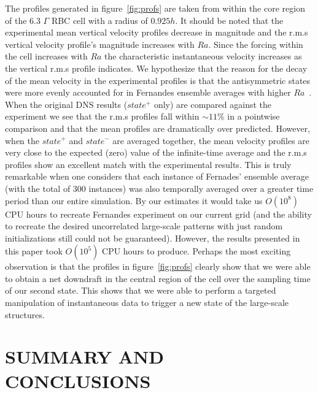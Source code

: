 \documentclass[twocolumn,10pt]{tsfp}
\begin{document}
The profiles generated in figure~\ref{fig:profs} are taken from within the core region of the 6.3 $\Gamma$ RBC cell with a radius of $0.925h$. It should be noted that the experimental mean vertical velocity profiles decrease in magnitude and the r.m.s vertical velocity profile's magnitude increases with $Ra$.  Since the forcing within the cell increases with $Ra$ the characteristic instantaneous velocity increases as the vertical r.m.s profile indicates. We hypothesize that the reason for the decay of the mean velocity in the experimental profiles is that the antisymmetric states were more evenly accounted for in Fernandes ensemble averages with higher $Ra$~\citep{fernandes2001spatial}. When the original DNS results ($state^+$ only) are compared against the experiment we see that the r.m.s profiles fall within $\sim11$\% in a pointwise comparison and that the mean profiles are dramatically over predicted.  However, when the $state^+$ and $state^-$ are averaged together, the mean velocity profiles are very close to the expected (zero) value of the infinite-time average and the r.m.s profiles show an excellent match with the experimental results. This is truly remarkable when one considers that each instance of Fernades' ensemble average (with the  total of 300 instances) was also temporally averaged over a greater time period than our entire simulation. By our estimates it would take us $O(10^8)$ CPU hours to recreate Fernandes experiment on our current grid (and the ability to recreate the desired uncorrelated large-scale patterns with just random initializations still could not be guaranteed). However, the results presented in this paper took $O(10^5)$ CPU hours to produce.  Perhaps the most exciting observation is that the profiles in figure~\ref{fig:profs} clearly show that we were able to obtain a net downdraft in the central region of the cell over the sampling time of our second state.   This shows that we were able to perform a targeted manipulation of instantaneous data to trigger a new state of the large-scale structures. 



\section*{SUMMARY AND CONCLUSIONS}
\end{document}
